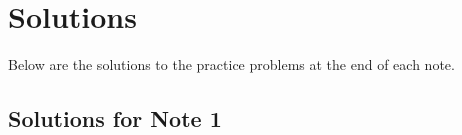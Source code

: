 \documentclass[../../../main.tex]{subfiles}
\begin{document}
\chapter{Solutions}

Below are the solutions to the practice problems at the end of
each note.

\section{Solutions for Note 1}
\end{document}
